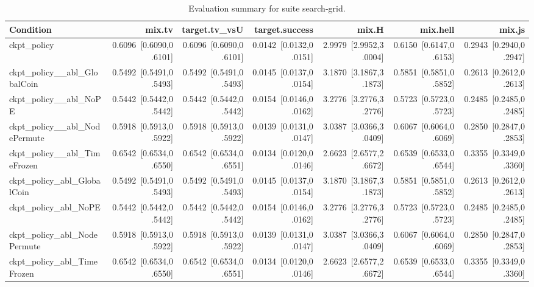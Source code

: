 \begin{table}[t]
\centering
\caption{Evaluation summary for suite search-grid.}
\label{tab:eval_search-grid}
\begin{tabular}{lrrrrrr}
\toprule
Condition & mix.tv & target.tv\_vsU & target.success & mix.H & mix.hell & mix.js \\
\midrule
ckpt\_policy & 0.6096~[0.6090,0.6101] & 0.6096~[0.6090,0.6101] & 0.0142~[0.0132,0.0151] & 2.9979~[2.9952,3.0004] & 0.6150~[0.6147,0.6153] & 0.2943~[0.2940,0.2947] \\
ckpt\_policy\_\_abl\_GlobalCoin & 0.5492~[0.5491,0.5493] & 0.5492~[0.5491,0.5493] & 0.0145~[0.0137,0.0154] & 3.1870~[3.1867,3.1873] & 0.5851~[0.5851,0.5852] & 0.2613~[0.2612,0.2613] \\
ckpt\_policy\_\_abl\_NoPE & 0.5442~[0.5442,0.5442] & 0.5442~[0.5442,0.5442] & 0.0154~[0.0146,0.0162] & 3.2776~[3.2776,3.2776] & 0.5723~[0.5723,0.5723] & 0.2485~[0.2485,0.2485] \\
ckpt\_policy\_\_abl\_NodePermute & 0.5918~[0.5913,0.5922] & 0.5918~[0.5913,0.5922] & 0.0139~[0.0131,0.0147] & 3.0387~[3.0366,3.0409] & 0.6067~[0.6064,0.6069] & 0.2850~[0.2847,0.2853] \\
ckpt\_policy\_\_abl\_TimeFrozen & 0.6542~[0.6534,0.6550] & 0.6542~[0.6534,0.6551] & 0.0134~[0.0120,0.0146] & 2.6623~[2.6577,2.6672] & 0.6539~[0.6533,0.6544] & 0.3355~[0.3349,0.3360] \\
ckpt\_policy\_abl\_GlobalCoin & 0.5492~[0.5491,0.5493] & 0.5492~[0.5491,0.5493] & 0.0145~[0.0137,0.0154] & 3.1870~[3.1867,3.1873] & 0.5851~[0.5851,0.5852] & 0.2613~[0.2612,0.2613] \\
ckpt\_policy\_abl\_NoPE & 0.5442~[0.5442,0.5442] & 0.5442~[0.5442,0.5442] & 0.0154~[0.0146,0.0162] & 3.2776~[3.2776,3.2776] & 0.5723~[0.5723,0.5723] & 0.2485~[0.2485,0.2485] \\
ckpt\_policy\_abl\_NodePermute & 0.5918~[0.5913,0.5922] & 0.5918~[0.5913,0.5922] & 0.0139~[0.0131,0.0147] & 3.0387~[3.0366,3.0409] & 0.6067~[0.6064,0.6069] & 0.2850~[0.2847,0.2853] \\
ckpt\_policy\_abl\_TimeFrozen & 0.6542~[0.6534,0.6550] & 0.6542~[0.6534,0.6551] & 0.0134~[0.0120,0.0146] & 2.6623~[2.6577,2.6672] & 0.6539~[0.6533,0.6544] & 0.3355~[0.3349,0.3360] \\
\bottomrule
\end{tabular}
\end{table}
